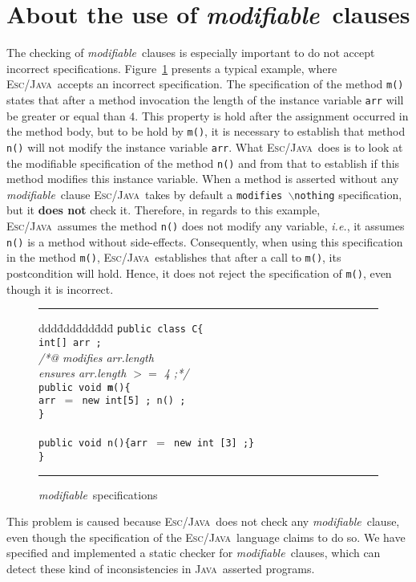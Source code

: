 \documentclass[a4paper]{llncs}
\newcommand{\escj}{\textsc{Esc/Java}}
\newcommand{\java}{\textsc{Java}}
\newcommand{\modif}{\textit{modifiable}}
\begin{document}
\section{About the use of \modif~clauses}
\label{sec-sem-mod-cla}
The checking of \modif~clauses is especially important to do not
accept incorrect specifications. Figure~\ref{fig-mod-spe} presents
a typical example, where \escj~accepts an incorrect specification. The
specification of the method
\texttt{m()} states that after a method invocation the length of the
instance variable \texttt{arr} will be greater or equal than $4$. This
property is hold after the assignment occurred in the
method body, but to be hold by \texttt{m()}, it is
necessary to establish that method \texttt{n()} will not modify the
instance variable \texttt{arr}. What \escj~does is to look at the
modifiable specification of the method \texttt{n()} and from that to
establish
if this method modifies this instance variable. When a method is
asserted without any \modif~clause \escj~takes by default a
\texttt{modifies $\backslash$nothing} specification, but it {\bf does
not} check it. Therefore, in regards to this example, \escj~assumes
the method \texttt{n()} does not modify any variable, \emph{i.e.}, it
assumes \texttt{n()} is a method without side-effects. Consequently,
when using this specification in the method \texttt{m()},
\escj~establishes that after a call to \texttt{m()}, its
postcondition will hold. Hence, it does not reject the specification of
\texttt{m()}, even though it is incorrect.
\begin{figure}[htb]
\rule{\linewidth}{0.25mm}
\begin{tabbing}
ddd\=ddd\=ddd\=ddd\= \kill 
\texttt{public class C\{} \\
\>\texttt{int[] arr ;} \\
\>\textsl{/*@ modifies arr.length}  \\
\>\>\textsl{ ensures arr.length $>=$ 4 ;*/} \\
\>\texttt{public void {\bf m}()\{} \\
\>\>\texttt{arr $=$ new int[5] ; n() ;} \\
\>\texttt{\}} \\
\\
\>\texttt{public void n()\{arr $=$ new int [3] ;\}} \\
\texttt{\}}
\end{tabbing}
\caption{\modif~specifications} 
\label{fig-mod-spe} 
\rule{\linewidth}{0.25mm} 
\end{figure} 
This problem is caused because \escj~does not check any \modif~clause,
even though the specification of the \escj~language claims to do so. We
have specified and implemented a static checker for \modif~clauses,
which can detect these kind of inconsistencies in \java~asserted
programs. 
\end{document}
